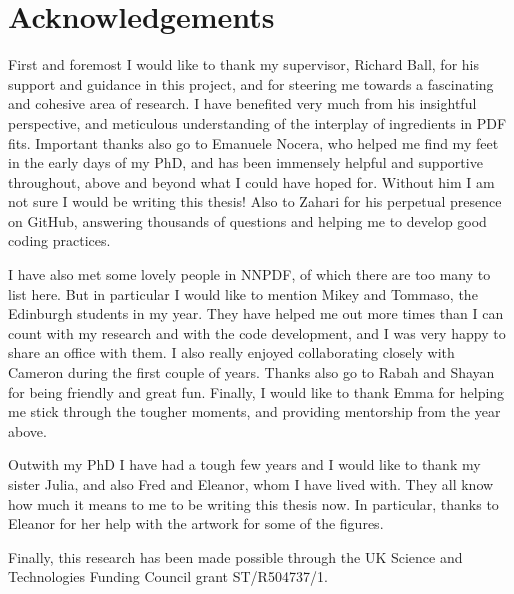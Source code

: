 \chapter{Acknowledgements}

\noindent

\normalsize

First and foremost I would like to thank my supervisor, Richard Ball, for his support and guidance in this project, and for steering me towards a fascinating and cohesive area of research. I have benefited very much from his insightful perspective, and meticulous understanding of the interplay of ingredients in PDF fits. Important thanks also go to Emanuele Nocera, who helped me find my feet in the early days of my PhD, and has been immensely helpful and supportive throughout, above and beyond what I could have hoped for. Without him I am not sure I would be writing this thesis! Also to Zahari for his perpetual presence on GitHub, answering thousands of questions and helping me to develop good coding practices. 

I have also met some lovely people in NNPDF, of which there are too many to list here. But in particular I would like to mention Mikey and Tommaso, the Edinburgh students in my year. They have helped me out more times than I can count with my research and with the code development, and I was very happy to share an office with them. I also really enjoyed collaborating closely with Cameron during the first couple of years. Thanks also go to Rabah and Shayan for being friendly and great fun. Finally, I would like to thank Emma for helping me stick through the tougher moments, and providing mentorship from the year above. 

Outwith my PhD I have had a tough few years and I would like to thank my sister Julia, and also Fred and Eleanor, whom I have lived with. They all know how much it means to me to be writing this thesis now. In particular, thanks to Eleanor for her help with the artwork for some of the figures. 

Finally, this research has been made possible through the UK Science and Technologies Funding Council grant ST/R504737/1.

